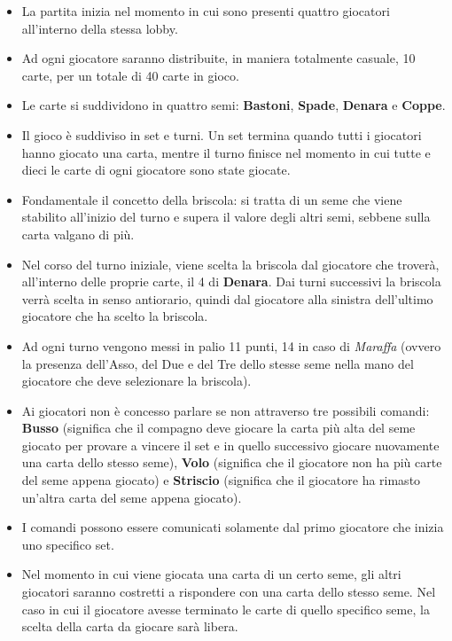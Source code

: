             \begin {itemize}
            \item La partita inizia nel momento in cui sono presenti quattro giocatori all'interno della stessa lobby.
            \item Ad ogni giocatore saranno distribuite, in maniera totalmente casuale, 10 carte, per un totale di 40 carte in gioco.
            \item Le carte si suddividono in quattro semi: \textbf{Bastoni}, \textbf{Spade}, \textbf{Denara} e \textbf{Coppe}.
            \item Il gioco è suddiviso in set e turni. Un set termina quando tutti i giocatori hanno giocato una carta, mentre il turno finisce nel momento in cui tutte e dieci le carte di ogni giocatore sono state giocate.
             \item Fondamentale il concetto della briscola: si tratta di un seme che viene stabilito all'inizio del turno e supera il valore degli altri semi, sebbene sulla carta valgano di più.
              \item Nel corso del turno iniziale, viene scelta la briscola dal giocatore che troverà, all'interno delle proprie carte, il 4 di \textbf{Denara}. Dai turni successivi la briscola verrà scelta in senso antiorario, quindi dal giocatore alla sinistra dell'ultimo giocatore che ha scelto la briscola.
            \item Ad ogni turno vengono messi in palio 11 punti, 14 in caso di \textit{Maraffa} (ovvero la presenza dell'Asso, del Due e del Tre dello stesse seme nella mano del giocatore che deve selezionare la briscola).
             \item Ai giocatori non è concesso parlare se non attraverso tre possibili comandi: \textbf{Busso} (significa che il compagno deve giocare la carta più alta del seme giocato per provare a vincere il set e in quello successivo giocare nuovamente una carta dello stesso seme), \textbf{Volo} (significa che il giocatore non ha più carte del seme appena giocato) e \textbf{Striscio} (significa che il giocatore ha rimasto un'altra carta del seme appena giocato).
            \item I comandi possono essere comunicati solamente dal primo giocatore che inizia uno specifico set.
            \item Nel momento in cui viene giocata una carta di un certo seme, gli altri giocatori saranno costretti a rispondere con una carta dello stesso seme. Nel caso in cui il giocatore avesse terminato le carte di quello specifico seme, la scelta della carta da giocare sarà libera.

\end{itemize}
